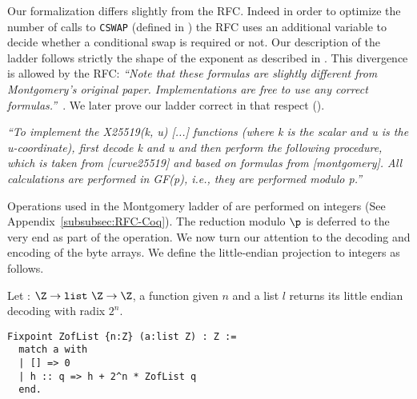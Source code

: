 Our formalization differs slightly from the RFC. Indeed in order to optimize the
number of calls to \texttt{CSWAP} (defined in )
the RFC uses an additional variable to decide
whether a conditional swap is required or not. Our description of the ladder
follows strictly the shape of the exponent as described in .
This divergence is allowed by the RFC:
\emph{``Note that these formulas are slightly different from Montgomery's
original paper. Implementations are free to use any correct formulas.''}~\cite{rfc7748}.
We later prove our ladder correct in that respect ().


\emph{``To implement the X25519(k, u) [...] functions (where k is
the scalar and u is the u-coordinate), first decode k and u and then
perform the following procedure, which is taken from [curve25519] and
based on formulas from [montgomery].  All calculations are performed
in GF(p), i.e., they are performed modulo p.''}~\cite{rfc7748}

Operations used in the Montgomery ladder of  are performed on
integers (See Appendix~\ref{subsubsec:RFC-Coq}).
The reduction modulo $\p$ is deferred to the very end as part of the
 operation. We now turn our attention to the decoding and encoding of the byte arrays.
We define the little-endian projection to integers as follows.
\begin{dfn}
Let  : $\Z \rightarrow \texttt{list}~\Z \rightarrow \Z$,
a function given $n$ and a list $l$ returns its little endian decoding with radix $2^n$.
\end{dfn}
\begin{lstlisting}[language=Coq,aboveskip=0pt,belowskip=1pt]
Fixpoint ZofList {n:Z} (a:list Z) : Z :=
  match a with
  | [] => 0
  | h :: q => h + 2^n * ZofList q
  end.
\end{lstlisting}


